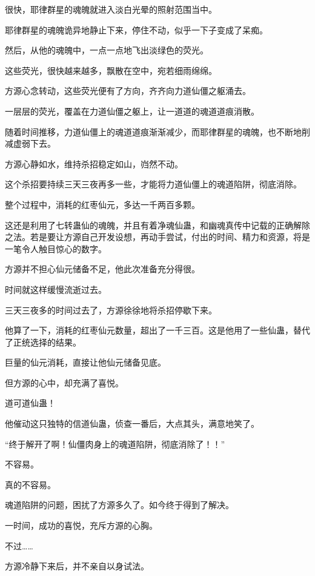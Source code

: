 
\begin{this_body}

很快，耶律群星的魂魄就进入淡白光晕的照射范围当中。

耶律群星的魂魄诡异地静止下来，停住不动，似乎一下子变成了呆痴。

然后，从他的魂魄中，一点一点地飞出淡绿色的荧光。

这些荧光，很快越来越多，飘散在空中，宛若细雨绵绵。

方源心念转动，这些荧光便有了方向，齐齐向力道仙僵之躯涌去。

一层层的荧光，覆盖在力道仙僵之躯上，让一道道的魂道道痕消散。

随着时间推移，力道仙僵上的魂道道痕渐渐减少，而耶律群星的魂魄，也不断地削减虚弱下去。

方源心静如水，维持杀招稳定如山，岿然不动。

这个杀招要持续三天三夜再多一些，才能将力道仙僵上的魂道陷阱，彻底消除。

整个过程中，消耗的红枣仙元，多达一千两百多颗。

这还是利用了七转蛊仙的魂魄，并且有着净魂仙蛊，和幽魂真传中记载的正确解除之法。若是要让方源自己开发设想，再动手尝试，付出的时间、精力和资源，将是一笔令人触目惊心的数字。

方源并不担心仙元储备不足，他此次准备充分得很。

时间就这样缓慢流逝过去。

三天三夜多的时间过去了，方源徐徐地将杀招停歇下来。

他算了一下，消耗的红枣仙元数量，超出了一千三百。这是他用了一些仙蛊，替代了正统选择的结果。

巨量的仙元消耗，直接让他仙元储备见底。

但方源的心中，却充满了喜悦。

道可道仙蛊！

他催动这只独特的信道仙蛊，侦查一番后，大点其头，满意地笑了。

“终于解开了啊！仙僵肉身上的魂道陷阱，彻底消除了！！”

不容易。

真的不容易。

魂道陷阱的问题，困扰了方源多久了。如今终于得到了解决。

一时间，成功的喜悦，充斥方源的心胸。

不过……

方源冷静下来后，并不亲自以身试法。


\end{this_body}
